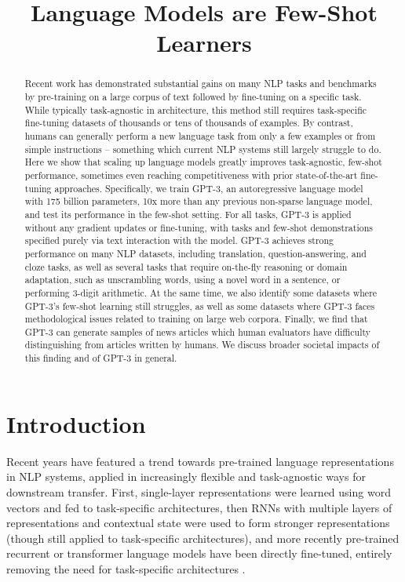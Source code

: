 \title{Language Models are Few-Shot Learners}

\begin{abstract}
Recent work has demonstrated substantial gains on many NLP tasks and benchmarks by pre-training on a large corpus of text followed by fine-tuning on a specific task. While typically task-agnostic in architecture, this method still requires task-specific fine-tuning datasets of thousands or tens of thousands of examples. By contrast, humans can generally perform a new language task from only a few examples or from simple instructions – something which current NLP systems still largely struggle to do. Here we show that scaling up language models greatly improves task-agnostic, few-shot performance, sometimes even reaching competitiveness with prior state-of-the-art fine-tuning approaches. Specifically, we train GPT-3, an autoregressive language model with 175 billion parameters, 10x more than any previous non-sparse language model, and test its performance in the few-shot setting.  For all tasks, GPT-3 is applied without any gradient updates or fine-tuning, with tasks and few-shot demonstrations specified purely via text interaction with the model.  GPT-3 achieves strong performance on many NLP datasets, including translation, question-answering, and cloze tasks, as well as several tasks that require on-the-fly reasoning or domain adaptation, such as unscrambling words, using a novel word in a sentence, or performing 3-digit arithmetic. At the same time, we also identify some datasets where GPT-3's few-shot learning still struggles, as well as some datasets where GPT-3 faces methodological issues related to training on large web corpora. Finally, we find that GPT-3 can generate samples of news articles which human evaluators have difficulty distinguishing from articles written by humans.  We discuss broader societal impacts of this finding and of GPT-3 in general.
\end{abstract}

\section{Introduction}
\label{section:Introduction}

Recent years have featured a trend towards pre-trained language representations in NLP systems, applied in increasingly flexible and task-agnostic ways for downstream transfer.  First, single-layer representations were learned using word vectors \cite{mikolov2013efficient, pennington2014glove} and fed to task-specific architectures, then RNNs with multiple layers of representations and contextual state were used to form stronger representations \cite{dai2015semi, mccann2017learned, peters2018dissecting} (though still applied to task-specific architectures), and more recently pre-trained recurrent or transformer language models \cite{vaswani2017attention}  have been directly fine-tuned, entirely removing the need for task-specific architectures \cite{radford2018gpt1, devlin2018bert, howard2018universal}.

